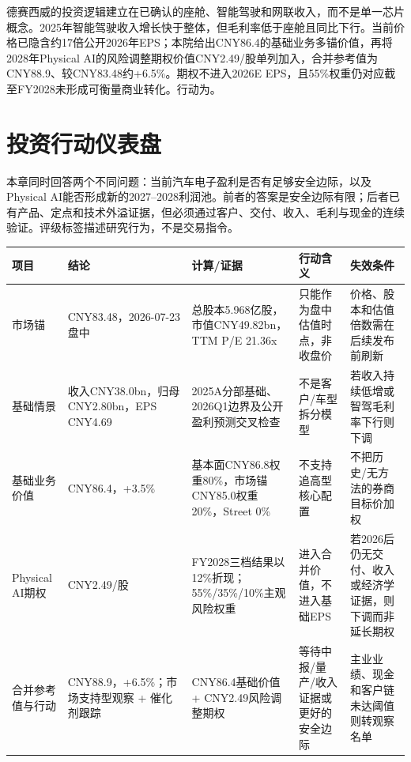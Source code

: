 \begin{keyinsight}
德赛西威的投资逻辑建立在已确认的座舱、智能驾驶和网联收入，而不是单一芯片概念。2025年智能驾驶收入增长快于整体，但毛利率低于座舱且同比下行。当前价格已隐含约17倍公开2026年EPS；本院给出CNY86.4的基础业务多锚价值，再将2028年Physical AI的风险调整期权价值CNY2.49/股单列加入，合并参考值为CNY88.9、较CNY83.48约+6.5\%。期权不进入2026E EPS，且55\%权重仍对应截至FY2028未形成可衡量商业转化。行动为。
\end{keyinsight}

\section{投资行动仪表盘}

本章同时回答两个不同问题：当前汽车电子盈利是否有足够安全边际，以及Physical AI能否形成新的2027--2028利润池。前者的答案是安全边际有限；后者已有产品、定点和技术外溢证据，但必须通过客户、交付、收入、毛利与现金的连续验证。评级标签描述研究行为，不是交易指令。

\begin{exhibitbox}[核心估值与行动]
\small
\begin{tabularx}{\textwidth}{L{2.4cm}Y Y Y Y}
\toprule
项目 & 结论 & 计算/证据 & 行动含义 & 失效条件 \\
\midrule
市场锚 & CNY83.48，2026-07-23盘中 & 总股本5.968亿股，市值CNY49.82bn，TTM P/E 21.36x & 只能作为盘中估值时点，非收盘价 & 价格、股本和估值倍数需在后续发布前刷新 \\
基础情景 & 收入CNY38.0bn，归母CNY2.80bn，EPS CNY4.69 & 2025A分部基础、2026Q1边界及公开盈利预测交叉检查 & 不是客户/车型拆分模型 & 若收入持续低增或智驾毛利率下行则下调 \\
基础业务价值 & CNY86.4，+3.5\% & 基本面CNY86.8权重80\%，市场锚CNY85.0权重20\%，Street 0\% & 不支持追高型核心配置 & 不把历史/无方法的券商目标价加权 \\
Physical AI期权 & CNY2.49/股 & FY2028三档结果以12\%折现；55\%/35\%/10\%主观风险权重 & 进入合并价值，不进入基础EPS & 若2026后仍无交付、收入或经济学证据，则下调而非延长期权 \\
合并参考值与行动 & CNY88.9，+6.5\%；市场支持型观察 + 催化剂跟踪 & CNY86.4基础价值 + CNY2.49风险调整期权 & 等待中报/量产/收入证据或更好的安全边际 & 主业业绩、现金和客户链未达阈值则转观察名单 \\
\bottomrule
\end{tabularx}
\end{exhibitbox}


